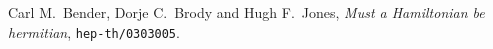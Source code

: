 \documentclass[a4paper,12pt]{article}
\begin{document}
\begin{thebibliography}{}
 Carl M.\ Bender, Dorje C.\ Brody and Hugh F.\ Jones,
          {\it Must a Hamiltonian be hermitian\/},
          {\tt hep-th/0303005}.
\end{thebibliography} 
%

%
\end{document}
